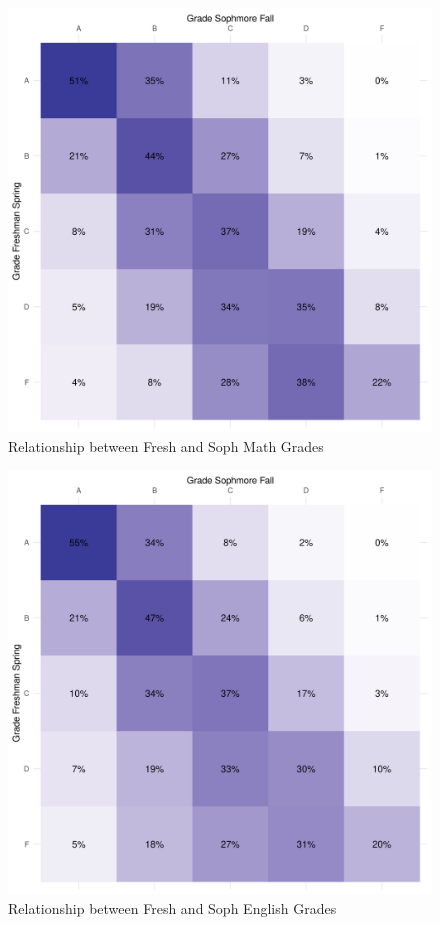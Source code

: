\documentclass{article}
\begin{document}
	
	
	
	
	

	\begin{figure}[h]
		\caption{Relationship between Fresh and Soph Math Grades}
		\centering
		\includegraphics{grade_comp_math.png}
	\end{figure}

	\begin{figure}[h]
		\caption{Relationship between Fresh and Soph English Grades}
		\centering
		\includegraphics{grade_comp_eng.png}
	\end{figure}
\end{document}
